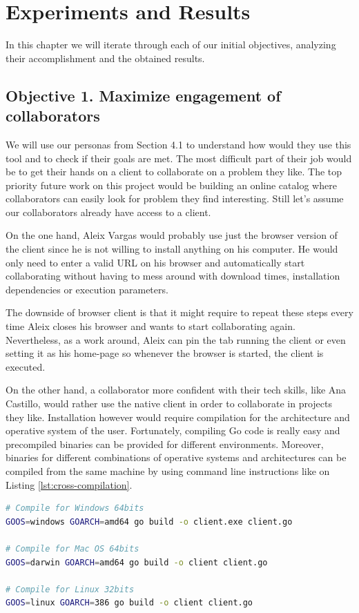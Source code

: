 \chapter{Experiments and Results}

In this chapter we will iterate through each of our initial objectives, analyzing their accomplishment and the obtained results.

\section{Objective 1. Maximize engagement of collaborators}

We will use our personas from Section 4.1 to understand how would they use this tool and to check if their goals are met. The most difficult part of their job would be to get their hands on a client to collaborate on a problem they like. The top priority future work on this project would be building an online catalog where collaborators can easily look for problem they find interesting. Still let's assume our collaborators already have access to a client.

On the one hand, Aleix Vargas would probably use just the browser version of the client since he is not willing to install anything on his computer. He would only need to enter a valid URL on his browser and automatically start collaborating without having to mess around with download times, installation dependencies or execution parameters. 

The downside of browser client is that it might require to repeat these steps every time Aleix closes his browser and wants to start collaborating again. Nevertheless, as a work around, Aleix can pin the tab running the client or even setting it as his home-page so whenever the browser is started, the client is executed.

On the other hand, a collaborator more confident with their tech skills, like Ana Castillo, would rather use the native client in order to collaborate in projects they like. Installation however would require compilation for the architecture and operative system of the user. Fortunately, compiling Go code is really easy and precompiled binaries can be provided for different environments. Moreover, binaries for different combinations of operative systems and architectures can be compiled from the same machine by using command line instructions like on Listing \ref{lst:cross-compilation}.

\begin{lstlisting}[language=bash,
caption={Cross-compilation of client for different operative systems and architectures from the same Linux machine.},
label={lst:cross-compilation},
captionpos=b]
# Compile for Windows 64bits
GOOS=windows GOARCH=amd64 go build -o client.exe client.go

# Compile for Mac OS 64bits
GOOS=darwin GOARCH=amd64 go build -o client client.go

# Compile for Linux 32bits
GOOS=linux GOARCH=386 go build -o client client.go
\end{lstlisting} 

